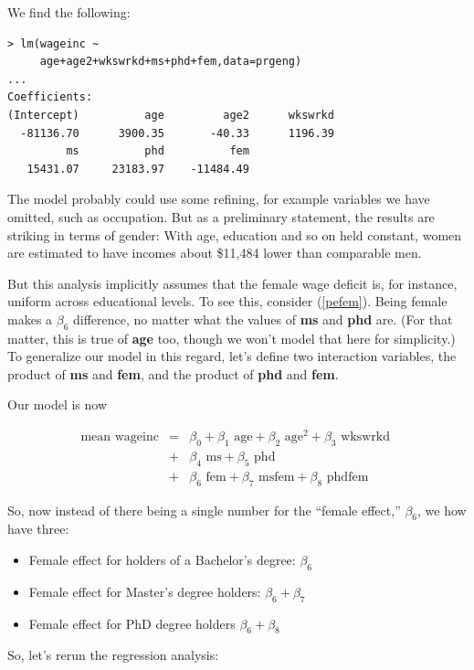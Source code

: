 We find the following:

\begin{lstlisting}
> lm(wageinc ~ 
     age+age2+wkswrkd+ms+phd+fem,data=prgeng)
...
Coefficients:
(Intercept)          age         age2      wkswrkd  
  -81136.70      3900.35       -40.33      1196.39  
         ms          phd          fem  
   15431.07     23183.97    -11484.49  
\end{lstlisting}

The model probably could use some refining, for example  variables we
have omitted, such as occupation.  But as a preliminary statement, the
results are striking in terms of gender: With age, education and so on
held constant, women are estimated to have incomes about \$11,484 lower
than comparable men.  

But this analysis implicitly assumes that the female wage deficit is,
for instance, uniform across educational levels.  To see this, consider
(\ref{pefem}).  Being female makes a $\beta_6$ difference, no matter
what the values of {\bf ms} and {\bf phd} are.  (For that matter, this
is true of {\bf age} too, though we won't model that here for simplicity.)
To generalize our model in this regard, let's define two interaction
variables, the product of {\bf ms} and {\bf fem}, and the product of
{\bf phd} and {\bf fem}.

Our model is now

\begin{eqnarray}
\label{pefem1}
\textrm{mean wageinc} 
&=& 
\beta_0 + 
\beta_1 \textrm{ age} + 
\beta_2 \textrm{ age}^2 +
\beta_3 \textrm{ wkswrkd } \nonumber \\
&+& 
\beta_4 \textrm{ ms} +
\beta_5 \textrm{ phd} \nonumber \\
&+& 
\beta_6 \textrm{ fem}  +
\beta_7 \textrm{ msfem}  +
\beta_8 \textrm{ phdfem}  
\end{eqnarray}

So, now instead of there being a single number for the ``female
effect,'' $\beta_6$, we how have three:

\begin{itemize}
\item Female effect for holders of a Bachelor's degree:  $\beta_6$
\item Female effect for Master's degree holders:  $\beta_6 + \beta_7$
\item Female effect for PhD degree holders  $\beta_6 + \beta_8$
\end{itemize}

So, let's rerun the regression analysis:

